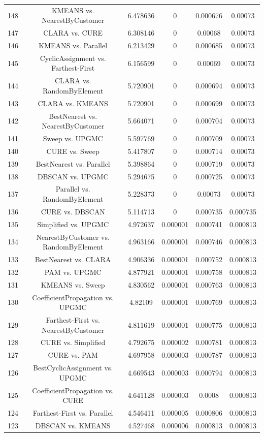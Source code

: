 \documentclass[a4paper,10pt]{article}
\begin{document}
\begin{landscape}
\begin{table}[!htp]
\begin{tabular}{cccccc}
148&KMEANS vs. NearestByCustomer&6.478636&0&0.000676&0.00073\\
147&CLARA vs. CURE&6.308146&0&0.00068&0.00073\\
146&KMEANS vs. Parallel&6.213429&0&0.000685&0.00073\\
145&CyclicAssignment vs. Farthest-First&6.156599&0&0.00069&0.00073\\
144&CLARA vs. RandomByElement&5.720901&0&0.000694&0.00073\\
143&CLARA vs. KMEANS&5.720901&0&0.000699&0.00073\\
142&BestNearest vs. NearestByCustomer&5.664071&0&0.000704&0.00073\\
141&Sweep vs. UPGMC&5.597769&0&0.000709&0.00073\\
140&CURE vs. Sweep&5.417807&0&0.000714&0.00073\\
139&BestNearest vs. Parallel&5.398864&0&0.000719&0.00073\\
138&DBSCAN vs. UPGMC&5.294675&0&0.000725&0.00073\\
137&Parallel vs. RandomByElement&5.228373&0&0.00073&0.00073\\
136&CURE vs. DBSCAN&5.114713&0&0.000735&0.000735\\
135&Simplified vs. UPGMC&4.972637&0.000001&0.000741&0.000813\\
134&NearestByCustomer vs. RandomByElement&4.963166&0.000001&0.000746&0.000813\\
133&BestNearest vs. CLARA&4.906336&0.000001&0.000752&0.000813\\
132&PAM vs. UPGMC&4.877921&0.000001&0.000758&0.000813\\
131&KMEANS vs. Sweep&4.830562&0.000001&0.000763&0.000813\\
130&CoefficientPropagation vs. UPGMC&4.82109&0.000001&0.000769&0.000813\\
129&Farthest-First vs. NearestByCustomer&4.811619&0.000001&0.000775&0.000813\\
128&CURE vs. Simplified&4.792675&0.000002&0.000781&0.000813\\
127&CURE vs. PAM&4.697958&0.000003&0.000787&0.000813\\
126&BestCyclicAssignment vs. UPGMC&4.669543&0.000003&0.000794&0.000813\\
125&CoefficientPropagation vs. CURE&4.641128&0.000003&0.0008&0.000813\\
124&Farthest-First vs. Parallel&4.546411&0.000005&0.000806&0.000813\\
123&DBSCAN vs. KMEANS&4.527468&0.000006&0.000813&0.000813\\

\end{tabular}
\end{table}
\end{landscape}
\end{document}
